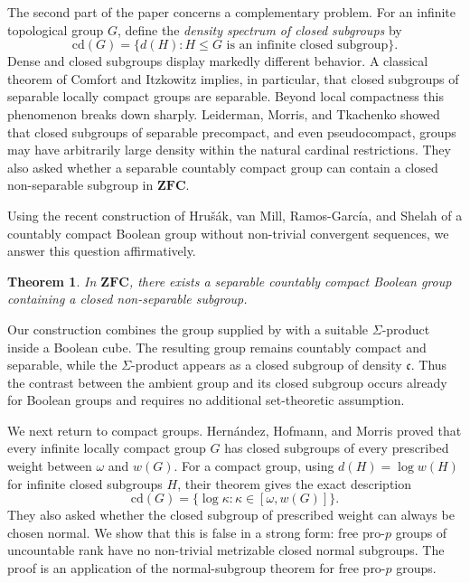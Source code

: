 \documentclass[12pt]{amsart}
\newtheorem{thmA}{Theorem}
\theoremstyle{definition}
\numberwithin{equation}{section}
\theoremstyle{remark}
\def\cd{\mathrm{cd}}
\begin{document}
The second part of the paper concerns a complementary problem. For an
infinite topological group $G$, define the \emph{density spectrum of closed
subgroups} by
\[
\cd(G)=\{d(H):H\leq G\text{ is an infinite closed subgroup}\}.
\]
Dense and closed subgroups display markedly different behavior. A
classical theorem of Comfort and Itzkowitz \cite{CIt} implies, in
particular, that closed subgroups of separable locally compact groups are
separable. Beyond local compactness this phenomenon breaks down sharply.
Leiderman, Morris, and Tkachenko \cite{LMT} showed that closed subgroups of
separable precompact, and even pseudocompact, groups may have arbitrarily
large density within the natural cardinal restrictions. They also asked
whether a separable countably compact group can contain a closed
non-separable subgroup in $\mathbf{ZFC}$.

Using the recent construction of Hru\v{s}\'ak, van Mill, Ramos-Garc\'ia,
and Shelah \cite{HMRS} of a countably compact Boolean group without
non-trivial convergent sequences, we answer this question affirmatively.

\begin{thmA}\label{ThB}
In $\mathbf{ZFC}$, there exists a separable countably compact Boolean group
containing a closed non-separable subgroup.
\end{thmA}

Our construction combines the group supplied by \cite{HMRS} with a
suitable $\Sigma$-product inside a Boolean cube. The resulting group
remains countably compact and separable, while the $\Sigma$-product
appears as a closed subgroup of density $\mathfrak c$. Thus the contrast
between the ambient group and its closed subgroup occurs already for
Boolean groups and requires no additional set-theoretic assumption.

We next return to compact groups. Hern\'andez, Hofmann, and Morris
\cite{HHM} proved that every infinite locally compact group $G$ has closed
subgroups of every prescribed weight between $\omega$ and $w(G)$. For a
compact group, using $d(H)=\log w(H)$ for infinite closed subgroups $H$,
their theorem gives the exact description
\[
\cd(G)=\{\log\kappa:\kappa\in[\omega,w(G)]\}.
\]
They also asked whether the closed subgroup of prescribed weight can
always be chosen normal. We show that this is false in a strong form:
free pro-$p$ groups of uncountable rank have no non-trivial metrizable
closed normal subgroups. The proof is an application of the normal-subgroup theorem for free pro-$p$ groups.
\end{document}
